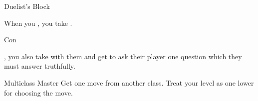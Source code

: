 \documentclass[8pt]{extarticle}
\begin{document}
\begin{multicols}{2}
\begin{amove}{Duelist’s Block}

  When you , you take .
\end{amove}


\begin{amove}{Con}

  , you also take  with them and get
  to ask their player one question which they must answer truthfully.
\end{amove}


\begin{amove}{Multiclass Master}
  Get one move from another class. Treat your level as one lower for
  choosing the move.
\end{amove}

\vfill\null
\end{multicols}
\end{document}
